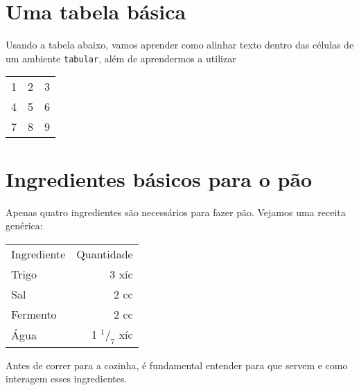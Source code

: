 \documentclass[a4paper,oneside]{article}
\begin{document}
\frenchspacing

\section{Uma tabela básica}

Usando a tabela abaixo, vamos aprender como alinhar texto dentro das células de
um ambiente \texttt{tabular}, além de aprendermos a utilizar 

\begin{center}
  \begin{tabular}{l c r}
    1 & 2 & 3\\
    4 & 5 & 6\\
    7 & 8 & 9\\
  \end{tabular}
\end{center}

\section{Ingredientes básicos para o pão}

Apenas quatro ingredientes são necessários para fazer pão. Vejamos uma receita
genérica:

\begin{center}
  \begin{tabular}{lr}
    Ingrediente & Quantidade\\[5pt]
    Trigo & 3 xíc\\
    Sal & 2 cc\\
    Fermento & 2 cc\\
    Água & 1 $^1/_7$ xíc
  \end{tabular}  
\end{center}

Antes de correr para a cozinha, é fundamental entender para que servem e como
interagem esses ingredientes.
\end{document}
